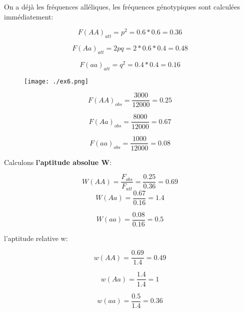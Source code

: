 \documentclass{article}
\begin{document}
On a déjà les fréquences alléliques, les fréquences génotypiques sont calculées immédiatement:

\begin{equation}
F(AA)_{att} = p^2 = 0.6 * 0.6 = 0.36
\end{equation}

\begin{equation}
F(Aa)_{att} = 2pq = 2*0.6*0.4 = 0.48
\end{equation}

\begin{equation}
F(aa)_{att} = q^2 = 0.4*0.4 = 0.16
\end{equation}

\begin{figure}[H]
\texttt{[image: ./ex6.png]}
\end{figure}


\begin{equation}
F(AA)_{obs} = \frac{3000}{12000} = 0.25
\end{equation}

\begin{equation}
F(Aa)_{obs} = \frac{8000}{12000} = 0.67
\end{equation}

\begin{equation}
F(aa)_{obs} = \frac{1000}{12000} = 0.08
\end{equation}

Calculons \textbf{l'aptitude absolue W}:

\begin{equation}
W(AA) = \frac{F_{obs}}{F_{att}} = \frac{0.25}{0.36} = 0.69
\end{equation}
\begin{equation}
W(Aa) = \frac{0.67}{0.16} = 1.4
\end{equation}

\begin{equation}
W(aa) = \frac{0.08}{0.16} = 0.5
\end{equation}


l'aptitude relative w:

\begin{equation}
w(AA) = \frac{0.69}{1.4} = 0.49
\end{equation}

\begin{equation}
w(Aa) = \frac{1.4}{1.4} = 1
\end{equation}

\begin{equation}
w(aa) = \frac{0.5}{1.4} = 0.36
\end{equation}
\end{document}
